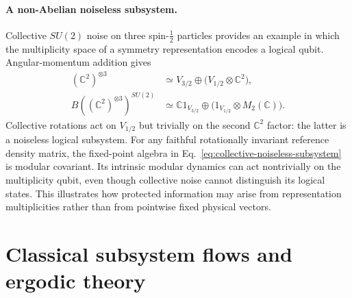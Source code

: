 \documentclass[a4paper,11pt]{article}
\theoremstyle{definition}
\begin{document}
\paragraph{A non-Abelian noiseless subsystem.}
Collective $SU(2)$ noise on three spin-$\frac12$ particles provides an
example in which the multiplicity space of a symmetry representation
encodes a logical qubit. Angular-momentum addition gives
\begin{align}
 (\mathbb C^2)^{\otimes3}
 &\simeq V_{3/2}\oplus\bigl(V_{1/2}\otimes\mathbb C^2\bigr),\nonumber\\
 B((\mathbb C^2)^{\otimes3})^{SU(2)}
 &\simeq\mathbb C1_{V_{3/2}}\oplus
       \bigl(1_{V_{1/2}}\otimes M_2(\mathbb C)\bigr).
 \label{eq:collective-noiseless-subsystem}
\end{align}
Collective rotations act on $V_{1/2}$ but trivially on the second
$\mathbb C^2$ factor: the latter is a noiseless logical subsystem.
For any faithful rotationally invariant reference density matrix, the
fixed-point algebra in Eq.~\eqref{eq:collective-noiseless-subsystem}
is modular covariant. Its intrinsic modular dynamics can act
nontrivially on the multiplicity qubit, even though collective noise
cannot distinguish its logical states. This illustrates how protected
information may arise from representation multiplicities rather than
from pointwise fixed physical vectors.





\section{Classical subsystem flows and ergodic theory}\label{sec:classical}
\end{document}
